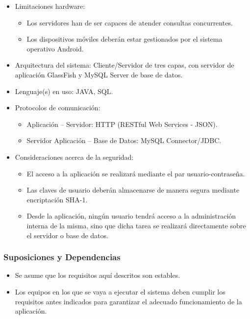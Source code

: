 \begin{itemize}	
	\item Limitaciones hardware:
	\begin{itemize}
		\item Los servidores han de ser capaces de atender consultas concurrentes.
		\item Los dispositivos móviles deberán estar gestionados por el sistema operativo Android.
	\end{itemize}
	\item Arquitectura del sistema: Cliente/Servidor de tres capas, con servidor de aplicación GlassFish y MySQL Server de base de datos.
	\item Lenguaje(s) en uso: JAVA, SQL.
	\item Protocolos de comunicación: 
	\begin{itemize}
		\item Aplicación -- Servidor: HTTP (RESTful Web Services - JSON).
		\item Servidor Aplicación -- Base de Datos: MySQL Connector/JDBC.
	\end{itemize}
	\item Consideraciones acerca de la seguridad:
	\begin{itemize}
		\item El acceso a la aplicación se realizará mediante el par usuario-contraseña.
		\item Las claves de usuario deberán almacenarse de manera segura mediante encriptación SHA-1.
		\item Desde la aplicación, ningún usuario tendrá acceso a la administración interna de la misma, sino que dicha tarea se realizará directamente sobre el servidor o base de datos.
	\end{itemize}
\end{itemize}

\subsubsection{Suposiciones y Dependencias}

\begin{itemize}	
	\item Se asume que los requisitos aquí descritos son estables.
	\item Los equipos en los que se vaya a ejecutar el sistema deben cumplir los requisitos antes indicados para garantizar el adecuado funcionamiento de la aplicación.
\end{itemize}

